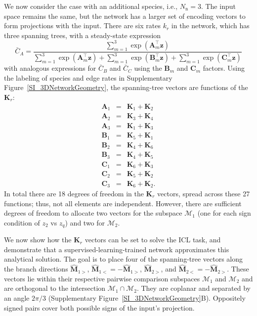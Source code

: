 \documentclass[%
reprint,
superscriptaddress,
amsmath,amssymb,
aps,
]{revtex4-2}
\begin{document}
\begin{onecolumngrid}
		We now consider the case with an additional species, i.e., $N_\text{n} = 3$. The input space remains the same, but the network has a larger set of encoding vectors to form projections with the input. There are six rates $k_r$ in the network, which has three spanning trees, with a steady-state expression
		\begin{equation}
			\bar{C}_A = \frac{\sum_{m=1}^{3}\exp\left(\mathbf{A}_m^\intercal\mathbf{z} \right) }{\sum_{m=1}^{3}\exp\left(\mathbf{A}_m^\intercal \mathbf{z} \right) + \sum_{m=1}^{3} \exp\left(\mathbf{B}_m^\intercal\mathbf{z} \right) + \sum_{m=1}^{3} \exp\left(\mathbf{C}_m^\intercal \mathbf{z} \right)}
		\end{equation}
		with analogous expressions for $\bar{C}_B$ and $\bar{C}_C$ using the $\mathbf{B}_m$ and $\mathbf{C}_m$ factors. Using the labeling of species and edge rates in Supplementary Figure~\ref{SI_3DNetworkGeometry}, the spanning-tree vectors are functions of the $\mathbf{K}_r$:
		\begin{eqnarray}
			\mathbf{A}_1 &=& \mathbf{K}_1 + \mathbf{K}_2 \nonumber \\
			\mathbf{A}_2 &=& \mathbf{K}_3 + \mathbf{K}_4 \nonumber \\
			\mathbf{A}_3 &=& \mathbf{K}_1 + \mathbf{K}_3 \nonumber \\
			\mathbf{B}_1 &=& \mathbf{K}_5 + \mathbf{K}_1 \nonumber \\
			\mathbf{B}_2 &=& \mathbf{K}_4 + \mathbf{K}_6 \nonumber \\
			\mathbf{B}_3 &=& \mathbf{K}_4 + \mathbf{K}_5 \nonumber \\
			\mathbf{C}_1 &=& \mathbf{K}_6 + \mathbf{K}_3 \nonumber \\
			\mathbf{C}_2 &=& \mathbf{K}_5 + \mathbf{K}_2 \nonumber \\
			\mathbf{C}_3 &=& \mathbf{K}_6 + \mathbf{K}_2. \nonumber
		\end{eqnarray}
		In total there are 18 degrees of freedom in the $\mathbf{K}_r$ vectors, spread across these 27 functions; thus, not all elements are independent. However, there are sufficient degrees of freedom to allocate two vectors for the subspace $\mathcal{M}_1$ (one for each sign condition of $z_2$ vs $z_q$) and two for $\mathcal{M}_2$.  
		
		We now show how the $\mathbf{K}_r$ vectors can be set to solve the ICL task, and demonstrate that a supervised-learning-trained network approximates this analytical solution. The goal is to place four of the spanning-tree vectors along the branch directions $\hat{\mathbf{M}}_{1>}$, $\hat{\mathbf{M}}_{1<} = - \hat{\mathbf{M}}_{1>}$, $\hat{\mathbf{M}}_{2>}$, and $\hat{\mathbf{M}}_{2<} = - \hat{\mathbf{M}}_{2>}$. These vectors lie within their respective pairwise comparison subspaces $\mathcal{M}_1$ and $\mathcal{M}_2$ and are orthogonal to the intersection $\mathcal{M}_1 \cap \mathcal{M}_2$. They are coplanar and separated by an angle $2\pi/3$ (Supplementary Figure~\ref{SI_3DNetworkGeometry}B). Oppositely signed pairs cover both possible signs of the input's projection.
		

\end{onecolumngrid}
\end{document}

